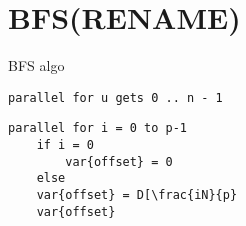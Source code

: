 \section{BFS(RENAME)}

BFS algo
\begin{verbatim}
parallel for u gets 0 .. n - 1
\end{verbatim}

\begin{verbatim}
parallel for i = 0 to p-1
    if i = 0
        var{offset} = 0
    else
    var{offset} = D[\frac{iN}{p}
    var{offset}


\end{verbatim}

\begin{figure*}[h!]
    \begin{minipage}{\textwidth}
        \begin{center}
\end{center}
\end{minipage}
\end{figure*}
